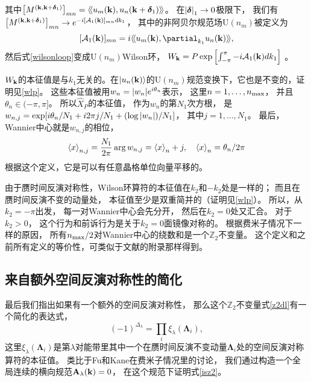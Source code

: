 其中$\bqty{M^{(\vb k,\vb k+\boldsymbol{\delta}_1)}}_{mn} =\krin{u_{m}(\vb k),u_n(\vb k+\boldsymbol{\delta}_1)}$。
在$\abs{\boldsymbol{\delta}}_1\rightarrow 0$极限下，
我们有$\bqty{M^{(\vb k,\vb k+\boldsymbol{\delta}_1)}}_{mn}\rightarrow e^{-i[\mathcal A_1(\vb k)]_{mn} dk_1}$，
其中的非阿贝尔规范场$\mathrm{U}(n_m)$被定义为
\begin{equation}\label{nonaa}
	[\mathcal A_{1}(\vb k)]_{mn}=i \krin{u_m(\vb k),\partial_{k_1} u_n(\vb k)},
\end{equation}
然后式\eqref{wilsonloop}变成$\mathrm{U}(n_m)$Wilson环，
$W_{\vb k}=P\exp\bqty{\int_{-\pi}^\pi -i\mathcal A_1(\vb k)dk_1}$ \cite{peskin1995an}。

$W_{\vb k}$的本征值是与$k_1$无关的。在$\ket{u_n(\vb k)}$的$\mathrm{U}(n_m)$规范变换下，它也是不变的，证明见\ref{wlp}。
这些本征值被用$w_n=\abs{w_n}e^{i\theta_n}$表示，
这里$n=1, \dots ,n_{\textnormal{max}}$，
并且$\theta_n\in (-\pi,\pi]$。
所以$\hat X_P$的本征值，
作为$w_n$的第$N_1$次方根，
是$w_{n,j}=\exp[i\theta_n/N_1+i 2\pi j/N_1 +(\log\abs{w_n})/N_1]$，
其中$j=1, \dots ,N_1$。
最后，
Wannier中心就是$w_{n,j}$的相位，
\begin{equation}
	\expval{x}_{n,j}=\frac{N_1}{2\pi}\arg w_{n,j}=\expval{x}_n+j,\quad \expval{x}_n=\theta_n/2\pi\nonumber
\end{equation}
根据这个定义，它是可以有任意晶格单位向量平移的。

由于赝时间反演对称性，Wilson环算符的本征值在$k_2$和$-k_2$处是一样的；
而且在赝时间反演不变的动量处，
本征值至少是双重简并的（证明见\ref{wlp}）。
所以，从$k_2=-\pi$出发，
每一对Wannier中心会先分开，
然后在$k_2=0$处又汇合。
对于$k_2>0$，
这个行为和前诉行为是关于$k_2=0$面镜像对称的。
根据费米子情况下一样的原因\cite{Yu2011}，
所有$n_{\textnormal{max}}/2$对Wannier中心的绕数和是一个$\mathbb Z_2$不变量。
这个定义和之前所有定义的等价性，可类似于文献\cite{Yu2011}的附录那样得到。


\subsection{来自额外空间反演对称性的简化}
最后我们指出如果有一个额外的空间反演对称性，
那么这个$\mathbb Z_2$不变量式\eqref{z2dl}有一个简化的表达式，
\begin{equation}\label{isz2}
	(-1)^{\Delta_\lambda }=\prod_i \xi_\lambda (\boldsymbol{\Lambda} _i),
\end{equation}
这里$\xi_\lambda (\boldsymbol{\Lambda} _i)$是第$\lambda $对能带里其中一个在赝时间反演不变动量$\boldsymbol{\Lambda} _i$处的空间反演对称算符的本征值。
类比于Fu和Kane在费米子情况里的讨论\cite{Fu2007}，
我们通过构造一个全局连续的横向规范$\vb A_\lambda (\vb k)=0$，
在这个规范下证明式\eqref{isz2}。


